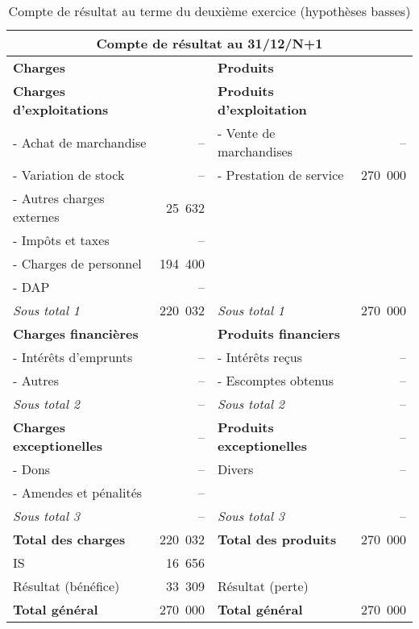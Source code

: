 		\vfill
		\begin{table}[h]
		  \centering
		  \begin{tabular}{|l|r|l|r|}
			\hline
			\multicolumn{4}{|c|}{\bf Compte de r\'esultat au 31/12/N+1}\\
			\hline
			{\bf Charges} & & {\bf Produits} & \\
			\hline
			{\bf Charges d'exploitations} & & {\bf Produits d'exploitation} & \\
			- Achat de marchandise & -- & - Vente de marchandises & --\\
			- Variation de stock & -- & - Prestation de service & 270~000\\
			- Autres charges externes & 25~632 & & \\
			- Impôts et taxes & -- & & \\
			- Charges de personnel & 194~400 & & \\
			- DAP & -- & & \\
			\cline{2-2}\cline{4-4}
			{\it Sous total 1} & 220~032 & {\it Sous total 1} & 270~000\\
			\cline{2-2}\cline{4-4}
			{\bf Charges financi\`eres} & & {\bf Produits financiers} & \\
			- Int\'er\^ets d'emprunts & -- & - Int\'er\^ets re\c cus & --\\
			- Autres & -- & - Escomptes obtenus & -- \\
			\cline{2-2}\cline{4-4}
			{\it Sous total 2} & -- & {\it Sous total 2} & -- \\
			\cline{2-2}\cline{4-4}
			{\bf Charges exceptionelles} & -- & {\bf Produits exceptionelles} & --\\
			- Dons & -- & Divers & --\\
			- Amendes et p\'enalit\'es & -- & & \\
			\cline{2-2}\cline{4-4}
			{\it Sous total 3} & -- & {\it Sous total 3} & -- \\
			\cline{2-2}\cline{4-4}
			{\bf Total des charges} & 220~032 & {\bf Total des produits} & 270~000 \\
			\cline{2-2}\cline{4-4}
			IS & 16~656 & & \\
			R\'esultat (b\'en\'efice) & 33~309 & R\'esultat (perte) & \\
			\cline{2-2}\cline{4-4}
			{\bf Total g\'en\'eral} & 270~000 & {\bf Total g\'en\'eral} & 270~000\\
			\hline
		  \end{tabular}
		  \caption{Compte de r\'esultat au terme du deuxi\`eme exercice (hypoth\`eses basses)}
		  \label{tab:hypBN1}
		\end{table}

